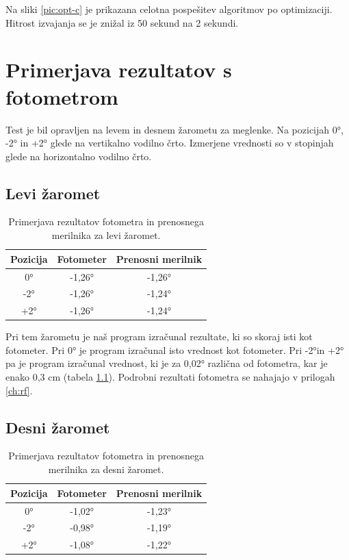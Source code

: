 \documentclass[oneside, a4paper, 12pt]{book}
\begin{document}
Na sliki \ref{pic:opt-c} je prikazana celotna pospešitev algoritmov po optimizaciji. Hitrost izvajanja se je znižal iz 50 sekund na 2 sekundi.

\chapter{Primerjava rezultatov s fotometrom}
\label{ch:primerjava}
Test je bil opravljen na levem in desnem žarometu za meglenke. Na pozicijah 0°, -2° in +2° glede na vertikalno vodilno črto. Izmerjene vrednosti so v stopinjah glede na horizontalno vodilno črto.

\section{Levi žaromet}

\begin{table}
\begin{center}
\begin{tabular}{c|c|c}
\textbf{Pozicija} & \textbf{Fotometer} & \textbf{Prenosni merilnik} \\ \hline
0° & -1,26° & -1,26°  \\ \hline
-2°  & -1,26° & -1,24°   \\ \hline
+2°  & -1,26° & -1,24°   \\ 
\end{tabular}
\end{center}
\caption{Primerjava rezultatov fotometra in prenosnega merilnika za levi žaromet.}
\label{tbl:primerjava-levi}
\end{table}

Pri tem žarometu je naš program izračunal rezultate, ki so skoraj isti kot fotometer. Pri 0° je program izračunal isto vrednost kot fotometer. Pri -2°in +2° pa je program izračunal vrednost, ki je za 0,02° različna od fotometra, kar je enako 0,3 cm (tabela \ref{tbl:primerjava-levi}). Podrobni rezultati fotometra se nahajajo v prilogah \ref{ch:rf}.

\section{Desni žaromet}

\begin{table}
\begin{center}
\begin{tabular}{c|c|c}
\textbf{Pozicija} & \textbf{Fotometer} & \textbf{Prenosni merilnik} \\ \hline
0° & -1,02° & -1,23°  \\ \hline
-2°  & -0,98° & -1,19°   \\ \hline
+2°  & -1,08° & -1,22°   \\ 
\end{tabular}
\end{center}
\caption{Primerjava rezultatov fotometra in prenosnega merilnika za desni žaromet.}
\label{tbl:primerjava-desni}
\end{table}
\end{document}
